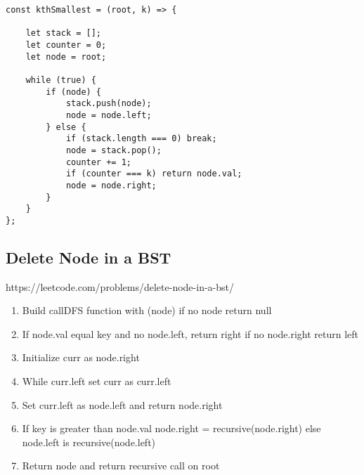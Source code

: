 \documentclass[10pt]{article}
\begin{document}
\begin{lstlisting}[title=Solution kthSmallest, captionpos=t]
const kthSmallest = (root, k) => {
    
    let stack = [];
    let counter = 0;
    let node = root;
    
    while (true) {
        if (node) {
            stack.push(node);
            node = node.left;
        } else {
            if (stack.length === 0) break;
            node = stack.pop();
            counter += 1;
            if (counter === k) return node.val;
            node = node.right;
        }
    }
};
\end{lstlisting}
\medskip %
















\pagebreak
\medskip   
\subsection {Delete Node in a BST}
https://leetcode.com/problems/delete-node-in-a-bst/

\begin{enumerate}
	\item Build callDFS function with (node) if no node return null
	\item If node.val equal key and no node.left, return right if no node.right return left
	\item Initialize curr as node.right
	\item While curr.left set curr as curr.left  
	\item Set curr.left as node.left and return node.right
	\item If key is greater than node.val node.right = recursive(node.right) else node.left is recursive(node.left)
	\item Return node and return recursive call on root
\end{enumerate}
\end{document}
